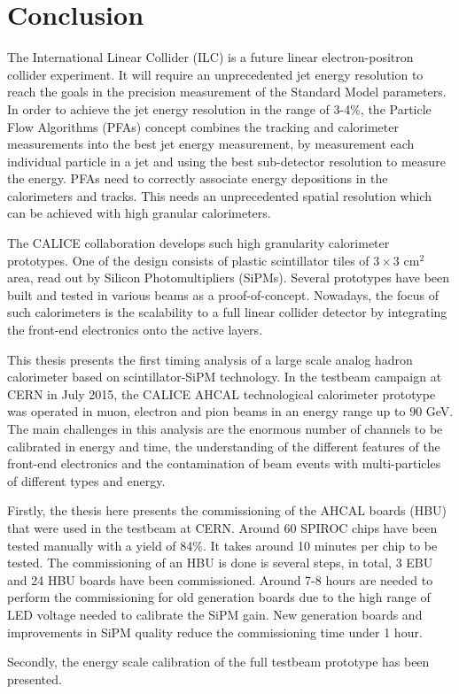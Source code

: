 \cleardoublepage
{}
{}
\chapter*{Conclusion}

The International Linear Collider (ILC) is a future linear electron-positron collider experiment. It will require an unprecedented jet energy resolution to reach the goals in the precision measurement of the Standard Model parameters. In order to achieve the jet energy resolution in the range of 3-4\%, the Particle Flow Algorithms (PFAs) concept combines the tracking and calorimeter measurements into the best jet energy measurement, by measurement each individual particle in a jet and using the best sub-detector resolution to measure the energy. PFAs need to correctly associate energy depositions in the calorimeters and tracks. This needs an unprecedented spatial resolution which can be achieved with high granular calorimeters.

The CALICE collaboration develops such high granularity calorimeter prototypes. One of the design consists of plastic scintillator tiles of $3\times3$ cm$^2$ area, read out by Silicon Photomultipliers (SiPMs). Several prototypes have been built and tested in various beams as a proof-of-concept. Nowadays, the focus of such calorimeters is the scalability to a full linear collider detector by integrating the front-end electronics onto the active layers.

This thesis presents the first timing analysis of a large scale analog hadron calorimeter based on scintillator-SiPM technology. In the testbeam campaign at CERN in July 2015, the CALICE AHCAL technological calorimeter prototype was operated in muon, electron and pion beams in an energy range up to 90 GeV. The main challenges in this analysis are the enormous number of channels to be calibrated in energy and time, the understanding of the different features of the front-end electronics and the contamination of beam events with multi-particles of different types and energy.

Firstly, the thesis here presents the commissioning of the AHCAL boards (HBU) that were used in the testbeam at CERN. Around 60 SPIROC chips have been tested manually with a yield of 84\%. It takes around 10 minutes per chip to be tested. The commissioning of an HBU is done is several steps, in total, 3 EBU and 24 HBU boards have been commissioned. Around 7-8 hours are needed to perform the commissioning for old generation boards due to the high range of LED voltage needed to calibrate the SiPM gain. New generation boards and improvements in SiPM quality reduce the commissioning time under 1 hour.

Secondly, the energy scale calibration of the full testbeam prototype has been presented.
